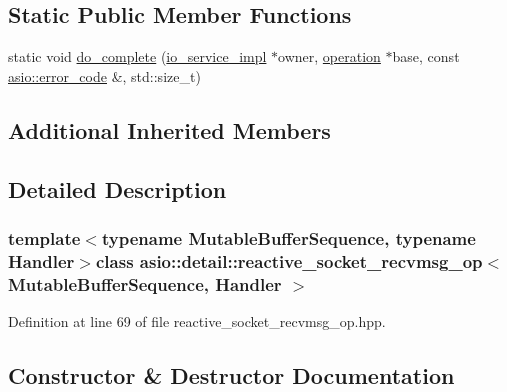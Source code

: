\subsection*{Static Public Member Functions}
\begin{DoxyCompactItemize}
\item 
static void \hyperlink{classasio_1_1detail_1_1reactive__socket__recvmsg__op_abac7c61cb050815caeffcb9c9d1a05ee}{do\+\_\+complete} (\hyperlink{namespaceasio_1_1detail_a6d61d9b8e53c11288be549d82aec5a42}{io\+\_\+service\+\_\+impl} $\ast$owner, \hyperlink{namespaceasio_1_1detail_a338968609bec20e37145309f8f9ec936}{operation} $\ast$base, const \hyperlink{classasio_1_1error__code}{asio\+::error\+\_\+code} \&, std\+::size\+\_\+t)
\end{DoxyCompactItemize}
\subsection*{Additional Inherited Members}


\subsection{Detailed Description}
\subsubsection*{template$<$typename Mutable\+Buffer\+Sequence, typename Handler$>$class asio\+::detail\+::reactive\+\_\+socket\+\_\+recvmsg\+\_\+op$<$ Mutable\+Buffer\+Sequence, Handler $>$}



Definition at line 69 of file reactive\+\_\+socket\+\_\+recvmsg\+\_\+op.\+hpp.



\subsection{Constructor \& Destructor Documentation}
\hypertarget{classasio_1_1detail_1_1reactive__socket__recvmsg__op_a7aa8dcf508b34cd6521c7cf188f39884}{}

